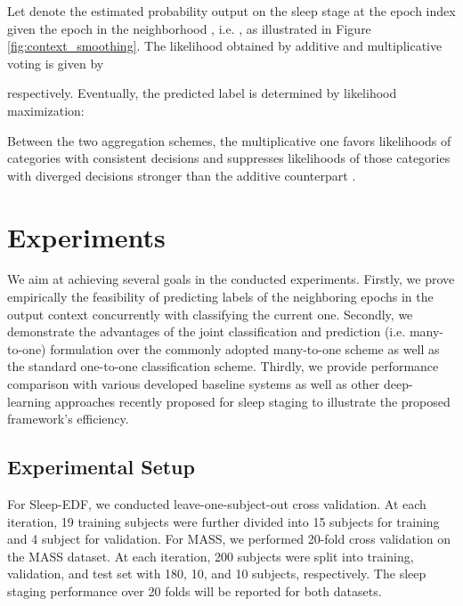 \documentclass[10pt,twocolumn,twoside]{IEEEtran}
\begin{document}
Let  denote the estimated probability output on the sleep stage  at the epoch index  given the epoch  in the neighborhood , i.e. , as illustrated in Figure \ref{fig:context_smoothing}. The likelihood  obtained by additive and multiplicative voting is given by

respectively. Eventually, the predicted label  is determined by likelihood maximization:


Between the two aggregation schemes, the multiplicative one favors likelihoods of categories with consistent decisions and suppresses likelihoods of those categories with diverged decisions stronger than the additive counterpart \cite{phan2017c}. 

\section{Experiments}
\label{sec:experiment}

We aim at achieving several goals in the conducted experiments. Firstly, we prove empirically the feasibility of predicting labels of the neighboring epochs in the output context concurrently with classifying the current one. Secondly, we demonstrate the advantages of the joint classification and prediction (i.e. many-to-one) formulation over the commonly adopted many-to-one scheme as well as the standard one-to-one classification scheme. Thirdly, we provide performance comparison with various developed baseline systems as well as other deep-learning approaches recently proposed for sleep staging to illustrate the proposed framework's efficiency.

\subsection{Experimental Setup}

For Sleep-EDF, we conducted leave-one-subject-out cross validation. At each iteration, 19 training subjects were further divided into 15 subjects for training and 4 subject for validation. For MASS, we performed 20-fold cross validation on the MASS dataset. At each iteration, 200 subjects were split into training, validation, and test set with 180, 10, and 10 subjects, respectively. The sleep staging performance over 20 folds will be reported for both datasets.
\end{document}
